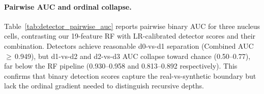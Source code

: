 \paragraph{Pairwise AUC and ordinal collapse.}
Table~\ref{tab:detector_pairwise_auc} reports pairwise binary AUC for three nucleus cells, contrasting our 19-feature RF with LR-calibrated detector scores and their combination.
Detectors achieve reasonable d0-vs-d1 separation (Combined AUC\,$\geq$\,0.949), but d1-vs-d2 and d2-vs-d3 AUC collapse toward chance (0.50--0.77), far below the RF pipeline (0.930--0.958 and 0.813--0.892 respectively).
This confirms that binary detection scores capture the real-vs-synthetic boundary but lack the ordinal gradient needed to distinguish recursive depths.

\begin{table}[h]
\centering
\small
\caption{Pairwise binary AUC for detector baselines vs.\ RF-19feat on three nucleus cells. RF uses 500-tree binary classifiers; detector methods use LR on continuous scores (Bino/FDGPT) or their combination. d1v2 and d2v3 AUC near 0.50 = ordinal collapse.}
\label{tab:detector_pairwise_auc}
\end{table}

